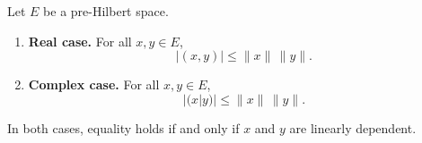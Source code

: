 Let $E$ be a pre-Hilbert space.

\begin{enumerate}
\item[(i)] \textbf{Real case.} For all $x, y \in E$,
$$|(x, y)| \leq \|x\| \, \|y\|.$$

\item[(ii)] \textbf{Complex case.} For all $x, y \in E$,
$$|(x|y)| \leq \|x\| \, \|y\|.$$
\end{enumerate}

In both cases, equality holds if and only if $x$ and $y$ are linearly dependent.
